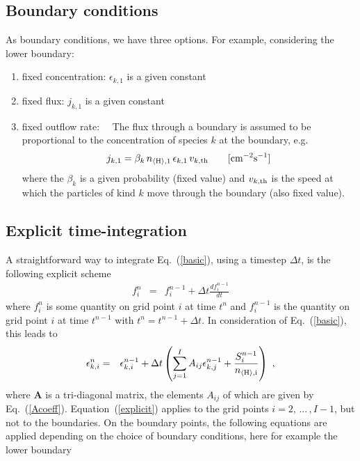 \documentclass[11pt]{article}
\def\nHi{n_{\langle\rm H\rangle,i}}
\def\nHleft{n_{\langle\rm H\rangle,1}}
\begin{document}
\subsection{Boundary conditions}

As boundary conditions, we have three options. For example,
considering the lower boundary: 
\begin{enumerate}
\item fixed concentration: \hspace*{10.5mm}$\epsilon_{k,1}$ is a given constant
\item fixed flux: \hspace*{27mm}$j_{k,1}$ is a given constant
\item fixed outflow rate: ~~The flux through a boundary is assumed to be
  proportional to the concentration of species $k$ at the boundary,
  e.g.
  \begin{equation}
    j_{k,1} = \beta_k\,\nHleft\,\epsilon_{k,1}\,v_{k,\rm th}  
    \quad\quad{\rm[cm^{-2}s^{-1}]}
  \end{equation}      
  where the $\beta_k$ is a given probability (fixed value) and 
  $v_{k,\rm th}$ is the speed at which the particles of kind $k$
  move through the boundary (also fixed value).
\end{enumerate} 

\subsection{Explicit time-integration}
A straightforward way to integrate Eq.~(\ref{basic}),
using a timestep $\Delta t$, is the following explicit scheme
\begin{eqnarray}
  f_i^{n} &=& f_i^{n-1} + \Delta t \frac{df_i^{n-1}}{dt}  
\end{eqnarray}
where $f^n_i$ is some quantity on grid point $i$ at time $t^n$
and $f^{n-1}_i$ is the quantity on grid point $i$ at time $t^{n-1}$
with $t^n=t^{n-1}+\Delta t$. In consideration of Eq.~(\ref{basic}),
this leads to
\begin{eqnarray}
  \epsilon_{k,i}^{n} &=& \epsilon_{k,i}^{n-1} + \Delta t 
     \left(\sum\limits_{j=1}^{I} A_{ij}\epsilon_{k,j}^{n-1}
           + \frac{S_i^{n-1}}{\nHi}\right)  \ ,
  \label{explicit}
\end{eqnarray}
where $\mathbf{A}$ is a tri-diagonal matrix, the elements $A_{ij}$
of which are given by Eq.~(\ref{Acoeff}). Equation~(\ref{explicit})
applies to the grid points $i=2,\,...\,,I-1$, but not to the boundaries. 
On the boundary points, the following equations are applied
depending on the choice of boundary conditions, here for example the
lower boundary
\end{document}
